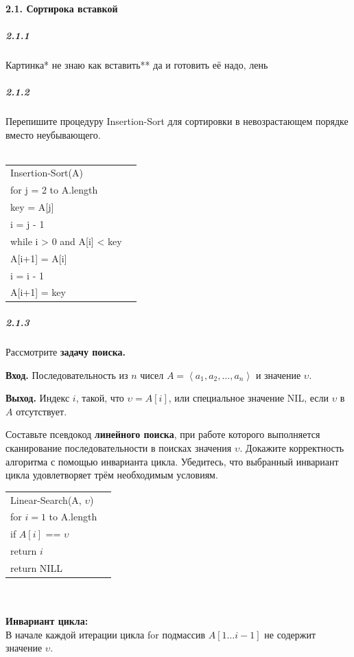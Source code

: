 \paragraph{2.1. Сортирока вставкой}
\subparagraph{2.1.1}
Картинка* не знаю как вставить** да и готовить её надо, лень

\subparagraph{2.1.2}
Перепишите процедуру Insertion-Sort для сортировки в невозрастающем порядке вместо неубывающего. \\
\\
\begin{tabular}{ll}
Insertion-Sort(A) & \\
\quad for j = 2 to A.length & \\
\quad \quad key = A[j] & \\
\quad \quad i = j - 1 & \\
\quad \quad while i > 0 and A[i] < key & \\
\quad \quad \quad A[i+1] = A[i] & \\
\quad \quad \quad i = i - 1 & \\
\quad \quad A[i+1] = key &
\end{tabular}

\subparagraph{2.1.3}
Рассмотрите {\bfseries задачу поиска.}

{\bfseries Вход.} Последовательность из $n$ чисел $A = \left\langle a_1, a_2, \ldots, a_n \right\rangle$ и значение $\upsilon$.

{\bfseries Выход.} Индекс $i$, такой, что $\upsilon = A[i]$, или специальное значение NIL, если $\upsilon$ в $A$ отсутствует.

Составьте псевдокод {\bfseries линейного поиска}, при работе которого выполняется сканирование последовательности в поисках значения $\upsilon$. Докажите корректность алгоритма с помощью инварианта цикла. Убедитесь, что выбранный инвариант цикла удовлетворяет трём необходимым условиям. \\

\begin{tabular}{ll}
Linear-Search(A, $\upsilon$) & \\
\quad for $i = 1$ to A.length & \\
\quad \quad if $A[i]$ == $\upsilon$ & \\
\quad \quad \quad return $i$ & \\
\quad return NILL & 
\end{tabular} \\
\\
\textbf{Инвариант цикла:} \\
В начале каждой итерации цикла for подмассив $A[1 \ldots i-1]$ не содержит значение $\upsilon$.

